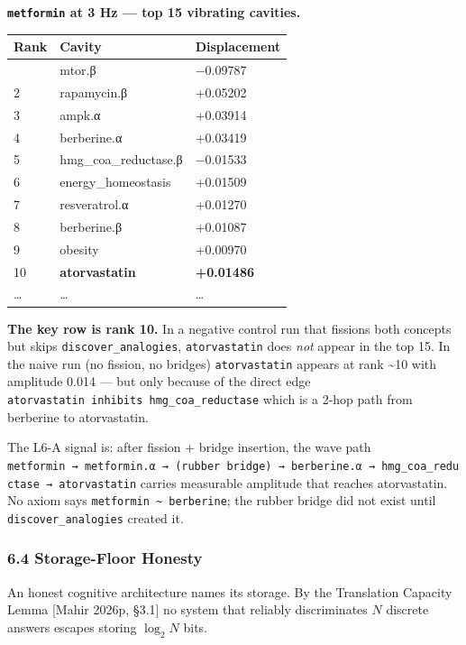 \documentclass[
  11pt,
  a4paper,
]{article}
\begin{document}
\textbf{\texttt{metformin} at 3 Hz --- top 15 vibrating cavities.}

\begin{longtable}[]{@{}lll@{}}
\toprule\noalign{}
Rank & Cavity & Displacement \\
\midrule\noalign{}
\endhead
\bottomrule\noalign{}
\endlastfoot
1 & mtor.β & −0.09787 \\
2 & rapamycin.β & +0.05202 \\
3 & ampk.α & +0.03914 \\
4 & berberine.α & +0.03419 \\
5 & hmg\_coa\_reductase.β & −0.01533 \\
6 & energy\_homeostasis & +0.01509 \\
7 & resveratrol.α & +0.01270 \\
8 & berberine.β & +0.01087 \\
9 & obesity & +0.00970 \\
10 & \textbf{atorvastatin} & \textbf{+0.01486} \\
\ldots{} & \ldots{} & \ldots{} \\
\end{longtable}

\textbf{The key row is rank 10.} In a negative control run that fissions
both concepts but skips \texttt{discover\_analogies},
\texttt{atorvastatin} does \emph{not} appear in the top 15. In the naive
run (no fission, no bridges) \texttt{atorvastatin} appears at rank
\textasciitilde10 with amplitude 0.014 --- but only because of the
direct edge \texttt{atorvastatin\ inhibits\ hmg\_coa\_reductase} which
is a 2-hop path from berberine to atorvastatin.

The L6-A signal is: after fission + bridge insertion, the wave path
\texttt{metformin\ →\ metformin.α\ →\ (rubber\ bridge)\ →\ berberine.α\ →\ hmg\_coa\_reductase\ →\ atorvastatin}
carries measurable amplitude that reaches atorvastatin. No axiom says
\texttt{metformin\ \textasciitilde{}\ berberine}; the rubber bridge did
not exist until \texttt{discover\_analogies} created it.

\subsubsection{6.4 Storage-Floor Honesty}\label{storage-floor-honesty}

An honest cognitive architecture names its storage. By the Translation
Capacity Lemma {[}Mahir 2026p, §3.1{]} no system that reliably
discriminates \(N\) discrete answers escapes storing \(\log_2 N\) bits.
\end{document}
